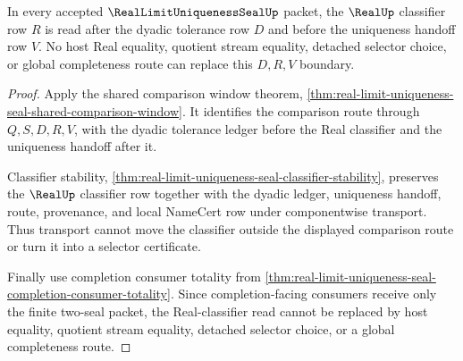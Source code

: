 \begin{theorem}
\label{thm:real-limit-uniqueness-seal-real-classifier-boundary}
In every accepted $\RealLimitUniquenessSealUp$ packet, the $\RealUp$ classifier row $R$ is read after the dyadic tolerance row $D$ and before the uniqueness handoff row $V$. No host Real equality, quotient stream equality, detached selector choice, or global completeness route can replace this $D,R,V$ boundary.
\end{theorem}
\begin{proof}
Apply the shared comparison window theorem, \autoref{thm:real-limit-uniqueness-seal-shared-comparison-window}. It identifies the comparison route through $Q,S,D,R,V$, with the dyadic tolerance ledger before the Real classifier and the uniqueness handoff after it.

Classifier stability, \autoref{thm:real-limit-uniqueness-seal-classifier-stability}, preserves the $\RealUp$ classifier row together with the dyadic ledger, uniqueness handoff, route, provenance, and local NameCert row under componentwise transport. Thus transport cannot move the classifier outside the displayed comparison route or turn it into a selector certificate.

Finally use completion consumer totality from \autoref{thm:real-limit-uniqueness-seal-completion-consumer-totality}. Since completion-facing consumers receive only the finite two-seal packet, the Real-classifier read cannot be replaced by host equality, quotient stream equality, detached selector choice, or a global completeness route.
\end{proof}

